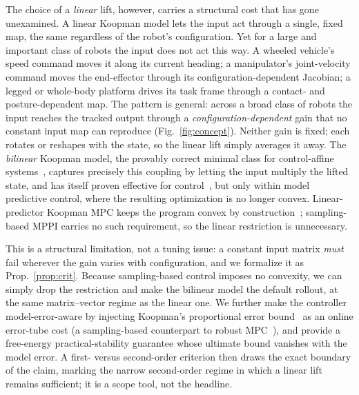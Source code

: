 \documentclass[lettersize,journal]{IEEEtran}
\theoremstyle{remark}
\begin{document}
The choice of a \emph{linear} lift, however, carries a structural cost that has gone unexamined.
A linear Koopman model lets the input act through a single, fixed map, the same regardless of the robot's configuration.
Yet for a large and important class of robots the input does not act this way.
A wheeled vehicle's speed command moves it along its current heading; a manipulator's joint-velocity command moves the end-effector through its configuration-dependent Jacobian; a legged or whole-body platform drives its task frame through a contact- and posture-dependent map.
The pattern is general: across a broad class of robots the input reaches the tracked output through a \emph{configuration-dependent} gain that no constant input map can reproduce (Fig.~\ref{fig:concept}).
Neither gain is fixed; each rotates or reshapes with the state, so the linear lift simply averages it away.
The \emph{bilinear} Koopman model, the provably correct minimal class for control-affine systems~\cite{iacob2024}, captures precisely this coupling by letting the input multiply the lifted state, and has itself proven effective for control~\cite{bruder2021bilinear,folkestad2021,mamakoukas2019}, but only within model predictive control, where the resulting optimization is no longer convex.
Linear-predictor Koopman MPC keeps the program convex by construction~\cite{korda2018mpc,strasser2026}; sampling-based MPPI carries no such requirement, so the linear restriction is unnecessary.

This is a structural limitation, not a tuning issue: a constant input matrix \emph{must} fail wherever the gain varies with configuration, and we formalize it as Prop.~\ref{prop:crit}.
Because sampling-based control imposes no convexity, we can simply drop the restriction and make the bilinear model the default rollout, at the same matrix--vector regime as the linear one.
We further make the controller model-error-aware by injecting Koopman's proportional error bound~\cite{strasser2026,safedmd2024} as an online error-tube cost (a sampling-based counterpart to robust MPC~\cite{williams2018robust}), and provide a free-energy practical-stability guarantee whose ultimate bound vanishes with the model error.
A first- versus second-order criterion then draws the exact boundary of the claim, marking the narrow second-order regime in which a linear lift remains sufficient; it is a scope tool, not the headline.
\end{document}
